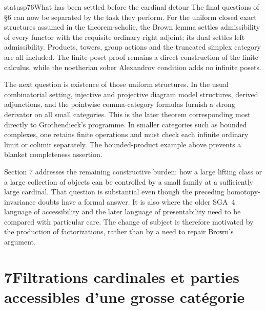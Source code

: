 \begin{dcomment}{status}{p76}{What has been settled before the cardinal detour}
The final questions of \S6 can now be separated by the task they perform. For the uniform closed exact structures assumed in the theorem-scholie, the Brown lemma settles admissibility of every functor with the requisite ordinary right adjoint; its dual settles left admissibility. Products, towers, group actions and the truncated simplex category are all included. The finite-poset proof remains a direct construction of the finite calculus, while the noetherian sober Alexandrov condition adds no infinite posets.

The next question is existence of those uniform structures. In the usual combinatorial setting, injective and projective diagram model structures, derived adjunctions, and the pointwise comma-category formulas furnish a strong derivator on all small categories. This is the later theorem corresponding most directly to Grothendieck's programme. In smaller categories such as bounded complexes, one retains finite operations and must check each infinite ordinary limit or colimit separately. The bounded-product example above prevents a blanket completeness assertion.

Section 7 addresses the remaining constructive burden: how a large lifting class or a large collection of objects can be controlled by a small family at a sufficiently large cardinal. That question is substantial even though the preceding homotopy-invariance doubts have a formal answer. It is also where the older SGA~4 language of accessibility and the later language of presentability need to be compared with particular care. The change of subject is therefore motivated by the production of factorizations, rather than by a need to repair Brown's argument.
\end{dcomment}


\section*{7\quad Filtrations cardinales et parties accessibles d'une grosse catégorie}

